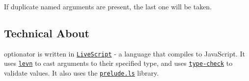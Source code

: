 If duplicate named arguments are present, the last one will be taken.

\subsection*{Technical About}

{\ttfamily optionator} is written in \href{http://livescript.net/}{\tt Live\+Script} -\/ a language that compiles to Java\+Script. It uses \href{https://github.com/gkz/levn}{\tt levn} to cast arguments to their specified type, and uses \href{https://github.com/gkz/type-check}{\tt type-\/check} to validate values. It also uses the \href{http://preludels.com/}{\tt prelude.\+ls} library. 